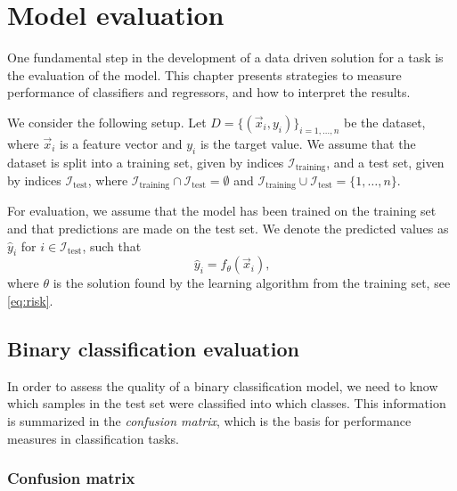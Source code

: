 \section{Model evaluation}
\label{sec:evaluation}

One fundamental step in the development of a data driven solution for a task is the
evaluation of the model. This chapter presents strategies to measure performance of
classifiers and regressors, and how to interpret the results.

We consider the following setup.  Let $D = \{(\vec{x}_i, y_i)\}_{i=1,\dots,n}$ be the
dataset, where $\vec{x}_i$ is a feature vector and $y_i$ is the target value.  We assume
that the dataset is split into a training set, given by indices
$\mathcal{I}_\text{training}$, and a test set, given by indices $\mathcal{I}_\text{test}$,
where $\mathcal{I}_\text{training} \cap \mathcal{I}_\text{test} = \emptyset$ and
$\mathcal{I}_\text{training} \cup \mathcal{I}_\text{test} = \{1,\dots,n\}$.

For evaluation, we assume that the model has been trained on the training set and that
predictions are made on the test set.  We denote the predicted values as $\hat{y}_i$ for
$i \in \mathcal{I}_\text{test}$, such that
\begin{equation*}
  \hat{y}_i = f_\theta(\vec{x}_i)\text{,}
\end{equation*}
where $\theta$ is the solution found by the learning algorithm from the training set, see
\cref{eq:risk}.

\subsection{Binary classification evaluation}

In order to assess the quality of a binary classification model, we need to know which
samples in the test set were classified into which classes.  This information is
summarized in the \emph{confusion matrix}, which is the basis for performance measures in
classification tasks.

\subsubsection{Confusion matrix}

